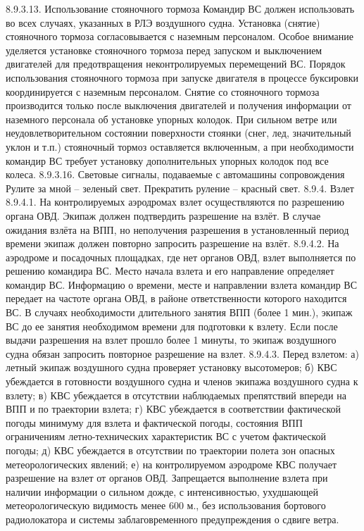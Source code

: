 8.9.3.13.	Использование стояночного тормоза 
Командир ВС должен использовать во всех случаях, указанных в РЛЭ воздушного судна. Установка (снятие) стояночного тормоза согласовывается с наземным персоналом. 
Особое внимание уделяется установке стояночного тормоза перед запуском и выключением двигателей для предотвращения неконтролируемых перемещений ВС. Порядок использования стояночного тормоза при запуске двигателя в процессе буксировки координируется с наземным персоналом. 
Снятие со стояночного тормоза производится только после выключения двигателей и получения информации от наземного персонала об установке упорных колодок. 
При сильном ветре или неудовлетворительном состоянии поверхности стоянки (снег, лед, значительный уклон и т.п.) стояночный тормоз оставляется включенным, а при необходимости командир ВС требует установку дополнительных упорных колодок под все колеса. 
 8.9.3.16.	Световые сигналы, подаваемые с автомашины сопровождения
Рулите за мной – зеленый свет.
Прекратить руление – красный свет.
8.9.4.	Взлет
8.9.4.1. На контролируемых аэродромах взлет осуществляются по разрешению органа ОВД. Экипаж должен подтвердить разрешение на взлёт. В случае ожидания взлёта на ВПП, но неполучения разрешения в установленный период времени экипаж должен повторно запросить разрешение на взлёт.
8.9.4.2. На аэродроме и посадочных площадках, где нет органов ОВД, взлет выполняется по решению командира ВС. Место начала взлета и его направление определяет командир ВС. Информацию о времени, месте 
и направлении взлета командир ВС передает на частоте органа ОВД, в районе ответственности которого находится ВС. В случаях необходимости длительного занятия ВПП (более 1 мин.), экипаж ВС до ее занятия необходимом времени для подготовки к взлету. Если после выдачи разрешения на взлет прошло более 1 минуты, то экипаж воздушного судна обязан запросить повторное разрешение на взлет.
8.9.4.3. Перед взлетом: 
а)	летный экипаж воздушного судна проверяет установку высотомеров; 
б)	КВС убеждается в готовности воздушного судна и членов экипажа воздушного судна к взлету; 
в)	КВС убеждается в отсутствии наблюдаемых препятствий впереди на ВПП и по траектории взлета; 
г)	КВС убеждается в соответствии фактической погоды минимуму для взлета и фактической погоды, состояния ВПП ограничениям летно-технических характеристик ВС с учетом фактической погоды; 
д)	КВС убеждается в отсутствии по траектории полета зон опасных метеорологических явлений; 
е)	на контролируемом аэродроме КВС получает разрешение на взлет от органов ОВД. 
Запрещается выполнение взлета при наличии информации о сильном дожде, с интенсивностью, ухудшающей метеорологическую видимость менее 600 м., без использования бортового радиолокатора и системы заблаговременного предупреждения о сдвиге ветра. 
